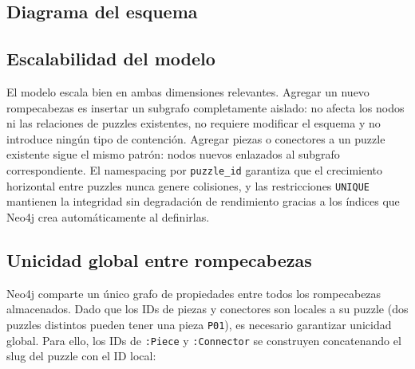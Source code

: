\documentclass[12pt,a4paper]{article}
\begin{document}
\subsection{Diagrama del esquema}

\begin{center}
\end{center}

\subsection{Escalabilidad del modelo}

El modelo escala bien en ambas dimensiones relevantes. Agregar un nuevo
rompecabezas es insertar un subgrafo completamente aislado: no afecta los nodos
ni las relaciones de puzzles existentes, no requiere modificar el esquema y no
introduce ningún tipo de contención. Agregar piezas o conectores a un puzzle
existente sigue el mismo patrón: nodos nuevos enlazados al subgrafo
correspondiente. El namespacing por \texttt{puzzle\_id} garantiza que el
crecimiento horizontal entre puzzles nunca genere colisiones, y las restricciones
\texttt{UNIQUE} mantienen la integridad sin degradación de rendimiento gracias a
los índices que Neo4j crea automáticamente al definirlas.

\subsection{Unicidad global entre rompecabezas}
\label{sec:unicidad}

Neo4j comparte un único grafo de propiedades entre todos los rompecabezas
almacenados. Dado que los IDs de piezas y conectores son locales a su puzzle
(dos puzzles distintos pueden tener una pieza \texttt{P01}), es necesario
garantizar unicidad global. Para ello, los IDs de \texttt{:Piece} y
\texttt{:Connector} se construyen concatenando el slug del puzzle con el ID
local:
\end{document}
